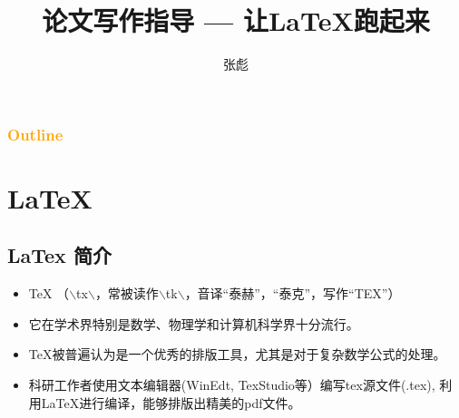 \documentclass[13pt]{ctexbeamer}
\begin{document}
\title[让LaTeX跑起来]{论文写作指导  ---  让LaTeX跑起来}
\author[]{{\large 张彪} }

\date{}


%



\begin{frame}
\maketitle
\end{frame}


\begin{frame}
	\frametitle{\textcolor{orange}{Outline}}
	\tableofcontents
\end{frame}




\section{LaTeX}

\subsection{LaTex 简介}
\begin{frame}
	\begin{itemize}
	\item 	TeX
（$\backslash$t\textepsilon x$\backslash$，常被读作$\backslash$t\textepsilon k$\backslash$，音译“泰赫”，“泰克”，写作“TEX”）

\item 它在学术界特别是数学、物理学和计算机科学界十分流行。
	\item
TeX被普遍认为是一个优秀的排版工具，尤其是对于复杂数学公式的处理。
	\item
科研工作者使用文本编辑器(WinEdt, TexStudio等）编写tex源文件(.tex), 利用LaTeX进行编译，能够排版出精美的pdf文件。
\end{itemize}
\end{frame}
\end{document}
